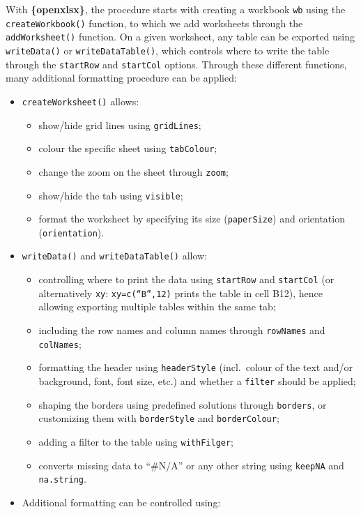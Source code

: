 \documentclass[
]{book}
\providecommand{\tightlist}{%
  \setlength{\itemsep}{0pt}\setlength{\parskip}{0pt}}
\begin{document}
With \textbf{\{openxlsx\}}, the procedure starts with creating a workbook \texttt{wb} using the \texttt{createWorkbook()} function, to which we add worksheets through the \texttt{addWorksheet()} function.
On a given worksheet, any table can be exported using \texttt{writeData()} or \texttt{writeDataTable()}, which controls where to write the table through the \texttt{startRow} and \texttt{startCol} options.
Through these different functions, many additional formatting procedure can be applied:

\begin{itemize}
\tightlist
\item
  \texttt{createWorksheet()} allows:

  \begin{itemize}
  \tightlist
  \item
    show/hide grid lines using \texttt{gridLines};
  \item
    colour the specific sheet using \texttt{tabColour};
  \item
    change the zoom on the sheet through \texttt{zoom};
  \item
    show/hide the tab using \texttt{visible};
  \item
    format the worksheet by specifying its size (\texttt{paperSize}) and orientation (\texttt{orientation}).
  \end{itemize}
\item
  \texttt{writeData()} and \texttt{writeDataTable()} allow:

  \begin{itemize}
  \tightlist
  \item
    controlling where to print the data using \texttt{startRow} and \texttt{startCol} (or alternatively \texttt{xy}: \texttt{xy=c(“B”,12)} prints the table in cell B12), hence allowing exporting multiple tables within the same tab;
  \item
    including the row names and column names through \texttt{rowNames} and \texttt{colNames};
  \item
    formatting the header using \texttt{headerStyle} (incl.~colour of the text and/or background, font, font size, etc.) and whether a \texttt{filter} should be applied;
  \item
    shaping the borders using predefined solutions through \texttt{borders}, or customizing them with \texttt{borderStyle} and \texttt{borderColour};
  \item
    adding a filter to the table using \texttt{withFilger};
  \item
    converts missing data to ``\#N/A'' or any other string using \texttt{keepNA} and \texttt{na.string}.
  \end{itemize}
\item
  Additional formatting can be controlled using:


\end{itemize}
\end{document}
